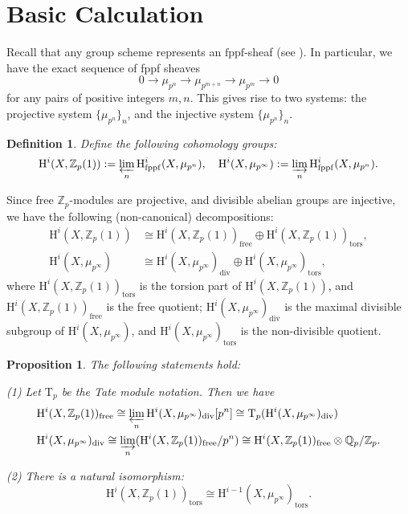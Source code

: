 \documentclass[a4paper,12pt,twoside]{report}
\newtheorem{definition}[theorem]{Definition}
\newtheorem{proposition}[theorem]{Proposition}
\newcommand{\Q}{\mathbb{Q}}
\newcommand{\Z}{\mathbb{Z}}
\newcommand{\fppf}{\mathrm{fppf}}
\newcommand{\HH}{\mathrm{H}}
\newcommand{\T}{\mathrm{T}}
\begin{document}
\section{Basic Calculation}\label{basiccalculation}

Recall that any group scheme represents an $\fppf$-sheaf (see \cite[Corollary II.1.7]{Mi}). 
In particular, we have the exact sequence of fppf sheaves
$$0\rightarrow \mu_{p^n}\rightarrow \mu_{p^{m+n}}\rightarrow \mu_{p^m}\rightarrow 0$$ for any pairs of positive integers $m,n$. 
This gives rise to two systems: the projective system $\{\mu_{p^n}\}_n$, and the injective system $\{\mu_{p^n}\}_n$. 

\begin{definition}\label{HiZp(1)}
    Define the following cohomology groups: \[\HH^i(X,\Z_p(1)):=\varprojlim_{n}\HH^i_{\fppf}(X,\mu_{p^n}), \quad \HH^i(X,\mu_{p^\infty}):=\varinjlim_{n}\HH^i_{\fppf}(X,\mu_{p^n}).\]
\end{definition}
Since free $\Z_p$-modules are projective, and divisible abelian groups are injective, 
we have the following (non-canonical) decompositions: 
\[\begin{aligned}
    \HH^i(X,\Z_p(1))&\cong \HH^i(X,\Z_p(1))_{\mathrm{free}}\oplus \HH^i(X,\Z_p(1))_{\mathrm{tors}},\\
    \HH^i(X,\mu_{p^\infty})&\cong \HH^i(X,\mu_{p^\infty})_{\mathrm{div}}\oplus \HH^i(X,\mu_{p^\infty})_{\mathrm{tors}},
\end{aligned}\]
where $\HH^i(X,\Z_p(1))_{\mathrm{tors}}$ is the torsion part of $\HH^i(X,\Z_p(1))$, and $\HH^i(X,\Z_p(1))_{\mathrm{free}}$ is the free quotient; 
$\HH^i(X,\mu_{p^\infty})_{\mathrm{div}}$ is the maximal divisible subgroup of $\HH^i(X,\mu_{p^\infty})$, and $ \HH^i(X,\mu_{p^\infty})_{\mathrm{tors}}$ is the non-divisible quotient. 
\begin{proposition}\label{proinj}The following statements hold: 
    
    {\rm (1)} Let $\T_p$ be the Tate module notation. Then we have \[\begin{aligned}
        &\HH^i(X,\Z_p(1))_{\mathrm{free}}\cong \varprojlim_n\HH^i(X,\mu_{p^\infty})_{\mathrm{div}}[p^n]\cong \T_p( \HH^i(X,\mu_{p^\infty})_{\mathrm{div}})\\
        &\HH^i(X,\mu_{p^\infty})_{\mathrm{div}}\cong \varinjlim_n (\HH^i(X,\Z_p(1))_{\mathrm{free}}/p^n)\cong \HH^i(X,\Z_p(1))_{\mathrm{free}}\otimes \Q_p/\Z_p.
    \end{aligned}\]

    {\rm (2)} There is a natural isomorphism: \[\HH^i(X,\Z_p(1))_{\mathrm{tors}}\cong \HH^{i-1}(X,\mu_{p^\infty})_{\mathrm{tors}}. \]
\end{proposition}
\end{document}
